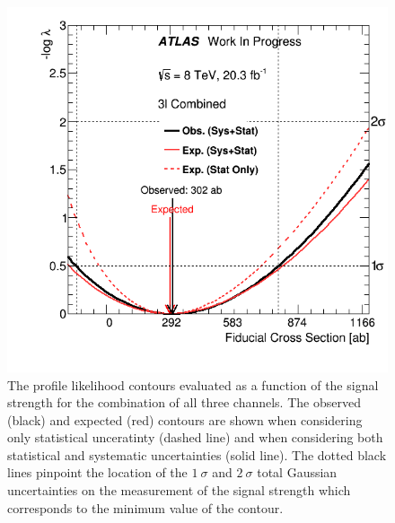 
\begin{figure}[ht!]
\centering
\includegraphics[scale=0.5]{figures/statistics/measurement/interval/combination.png}
\caption{The profile likelihood contours evaluated as a function of the signal strength
for the combination of all three channels. 
The observed (black) and expected (red) contours are shown when considering only statistical unceratinty (dashed line) and when considering both statistical and systematic uncertainties (solid line).
The dotted black
lines pinpoint the location of the $1~\sigma$ and $2~\sigma$ total Gaussian uncertainties
on the measurement of the signal strength which corresponds to the minimum value of the contour.}
\label{fig:stat_measurement_interval_combination}
\end{figure}


